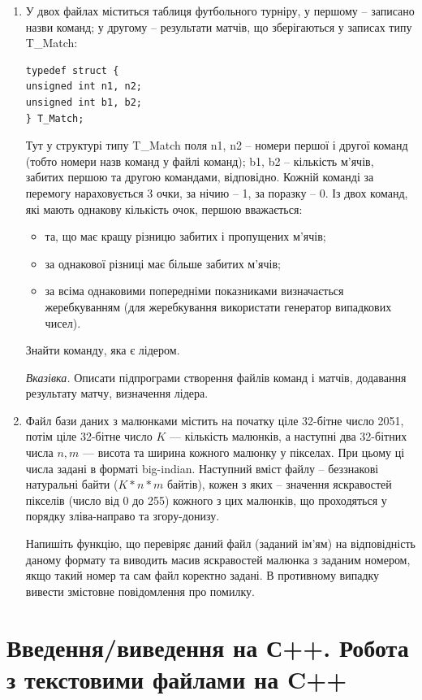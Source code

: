 \documentclass[a5paper,titlepage,openany,twoside,draft]{book_unv}%
\begin{document}
\begin{enumerate}
\def\labelenumi{\arabic{enumi})}
\setcounter{enumi}{12}
\item
  У двох файлах міститься таблиця футбольного турніру, у першому --
  записано назви команд; у другому -- результати матчів, що зберігаються
  у записах типу T\_Match:
\begin{verbatim}
typedef struct {
unsigned int n1, n2;
unsigned int b1, b2;
} T_Match;
\end{verbatim}
Тут у структурі типу T\_Match поля n1, n2 -- номери першої і другої 
команд (тобто номери назв команд у файлі команд); b1, b2 -- кількість
м'ячів, забитих першою та другою командами, відповідно.
Кожній команді за перемогу нараховується 3 очки, за нічию -- 1, за
поразку -- 0.
Із двох команд, які мають однакову кількість очок, першою вважається:
\begin{itemize}
\item
та, що має кращу різницю забитих і пропущених м'ячів;
\item
за однакової різниці має більше забитих м'ячів;
\item
за всіма однаковими попередніми показниками визначається жеребкуванням
(для жеребкування використати генератор випадкових чисел).
\end{itemize}
Знайти команду, яка є лідером.

\emph{Вказівка.} Описати підпрограми створення файлів команд і матчів, 
додавання результату матчу, визначення лідера.

\item
Файл бази даних з малюнками містить на початку ціле 32-бітне число
2051, потім ціле 32-бітне число $K$ --- кількість малюнків, а наступні два
32-бітних числа $n,m$ --- висота та ширина кожного малюнку у
пікселах. При цьому ці числа задані в форматі big-indian.
Наступний вміст файлу -- беззнакові натуральні байти ($K*n*m$ байтів),
кожен з яких -- значення яскравостей пікселів (число від 0 до 255)
кожного з цих малюнків, що проходяться у порядку зліва-направо та
згору-донизу.

Напишіть функцію, що перевіряє даний файл (заданий ім'ям) на
відповідність даному формату та виводить масив яскравостей малюнка з
заданим номером, якщо такий номер та сам файл коректно задані. В
противному випадку вивести змістовне повідомлення про помилку.

\end{enumerate}


\chapter{Введення/виведення на С++. Робота з текстовими файлами на C++}
%
\end{document}
